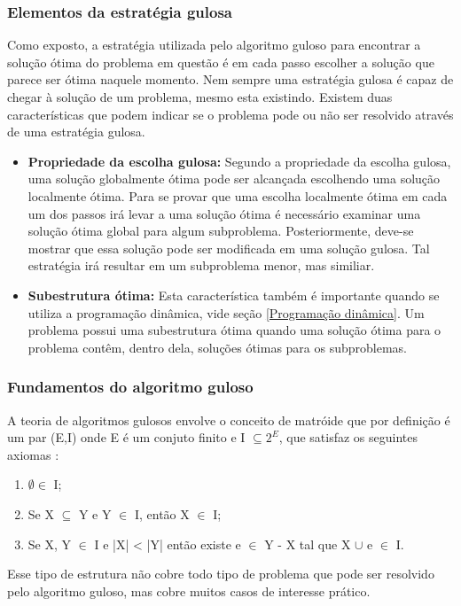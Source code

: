 \subsubsection{Elementos da estratégia gulosa}
Como exposto, a estratégia utilizada pelo algoritmo guloso para encontrar a solução ótima do problema em questão é em cada passo escolher a solução que parece ser ótima naquele momento. Nem sempre uma estratégia gulosa é capaz de chegar à solução de um problema, mesmo esta existindo. Existem duas características que podem indicar se o problema pode ou não ser resolvido através de uma estratégia gulosa.
\begin{itemize}
\item \textbf{Propriedade da escolha gulosa:} Segundo a propriedade da escolha gulosa, uma solução globalmente ótima pode ser alcançada escolhendo uma solução localmente ótima. Para se provar que uma escolha localmente ótima em cada um dos passos irá levar a uma solução ótima é necessário examinar uma solução ótima global para algum subproblema. Posteriormente, deve-se mostrar que essa solução pode ser modificada em uma solução gulosa. Tal estratégia irá resultar em um subproblema menor, mas similiar.
\item \textbf{Subestrutura ótima:} Esta característica também é importante quando se utiliza a programação dinâmica, vide seção \ref{Programação dinâmica}. Um problema possui uma subestrutura ótima quando uma solução ótima para o problema contêm, dentro dela, soluções ótimas para os subproblemas.
\end{itemize}
\subsubsection{Fundamentos do algoritmo guloso}
A teoria de algoritmos gulosos envolve o conceito de matróide que por definição é um par (E,I) onde E é um conjuto finito e I $\subseteq 2^{E}$, que satisfaz os seguintes axiomas \cite{paulo2007cobertura}:
\begin{enumerate}[label=(\roman*)]
\item $\emptyset \in$ I;
\item Se X $\subseteq$ Y e Y $\in$ I, então X $\in$ I;
\item Se X, Y $\in$ I e |X| < |Y| então existe e $\in$ Y - X tal que X $\cup$ e $\in$ I.
\end{enumerate}
Esse tipo de estrutura não cobre todo tipo de problema que pode ser resolvido pelo algoritmo guloso, mas cobre muitos casos de interesse prático.

